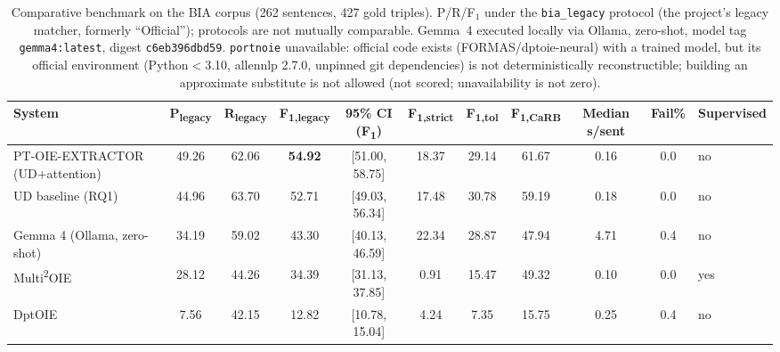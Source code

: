 \begin{table}[t]
\centering
\small
\begin{tabular}{lccccccccc}
\toprule
System & P\textsubscript{legacy} & R\textsubscript{legacy} & F\textsubscript{1,legacy} & 95\% CI (F\textsubscript{1}) & F\textsubscript{1,strict} & F\textsubscript{1,tol} & F\textsubscript{1,CaRB} & Median s/sent & Fail\% & Supervised \\
\midrule
PT-OIE-EXTRACTOR (UD+attention) & 49.26 & 62.06 & \textbf{54.92} & [51.00, 58.75] & 18.37 & 29.14 & 61.67 & 0.16 & 0.0 & no \\
UD baseline (RQ1) & 44.96 & 63.70 & 52.71 & [49.03, 56.34] & 17.48 & 30.78 & 59.19 & 0.18 & 0.0 & no \\
Gemma 4 (Ollama, zero-shot) & 34.19 & 59.02 & 43.30 & [40.13, 46.59] & 22.34 & 28.87 & 47.94 & 4.71 & 0.4 & no \\
Multi\textsuperscript{2}OIE & 28.12 & 44.26 & 34.39 & [31.13, 37.85] & 0.91 & 15.47 & 49.32 & 0.10 & 0.0 & yes \\
DptOIE & 7.56 & 42.15 & 12.82 & [10.78, 15.04] & 4.24 & 7.35 & 15.75 & 0.25 & 0.4 & no \\
\bottomrule
\end{tabular}
\caption{Comparative benchmark on the BIA corpus (262 sentences, 427 gold triples). P/R/F$_1$ under the \texttt{bia\_legacy} protocol (the project's legacy matcher, formerly ``Official''); protocols are not mutually comparable. Gemma~4 executed locally via Ollama, zero-shot, model tag \texttt{gemma4:latest}, digest \texttt{c6eb396dbd59}. \texttt{portnoie} unavailable: official code exists (FORMAS/dptoie-neural) with a trained model, but its official environment (Python$<$3.10, allennlp 2.7.0, unpinned git dependencies) is not deterministically reconstructible; building an approximate substitute is not allowed (not scored; unavailability is not zero).}
\label{tab:benchmark}
\end{table}